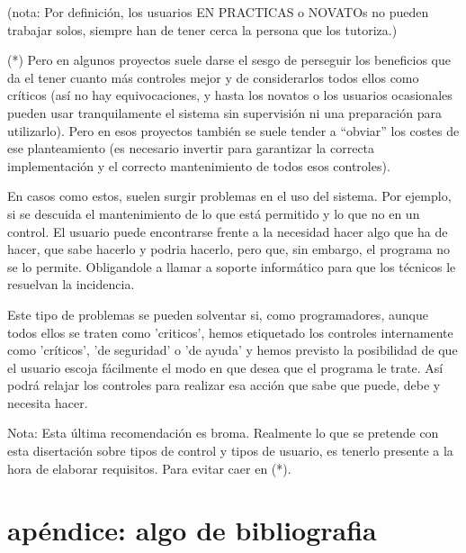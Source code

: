 \documentclass[spanish,12pt,a4paper,final,oneside]{book}
\begin{document}
(nota: Por definición, los usuarios EN PRACTICAS o NOVATOs no pueden trabajar solos, siempre han de tener cerca la persona que los tutoriza.)

(*) Pero en algunos proyectos suele darse el sesgo de perseguir los beneficios que da el tener cuanto más controles mejor y de considerarlos todos ellos como críticos (así no hay equivocaciones, y hasta los novatos o los usuarios ocasionales pueden usar tranquilamente el sistema sin supervisión ni una preparación para utilizarlo). Pero en esos proyectos también se suele tender a ``obviar'' los costes de ese planteamiento (es necesario invertir para garantizar la correcta implementación y el correcto mantenimiento de todos esos controles).

En casos como estos, suelen surgir problemas en el uso del sistema. Por ejemplo, si se descuida el mantenimiento de lo que está permitido y lo que no en un control. El usuario puede encontrarse frente a la necesidad hacer algo que ha de hacer, que sabe hacerlo y podria hacerlo, pero que, sin embargo, el programa no se lo permite. Obligandole a llamar a soporte informático para que los técnicos le resuelvan la incidencia. 

Este tipo de problemas se pueden solventar si, como programadores, aunque todos ellos se traten como 'criticos', hemos etiquetado los controles internamente como 'críticos', 'de seguridad' o 'de ayuda' y hemos previsto la posibilidad de que el usuario escoja fácilmente el modo en que desea que el programa le trate. Así podrá relajar los controles para realizar esa acción que sabe que puede, debe y necesita hacer.

Nota: Esta última recomendación es broma. Realmente lo que se pretende con esta disertación sobre tipos de control y tipos de usuario, es tenerlo presente a la hora de elaborar requisitos. Para evitar caer en (*).

\chapter{apéndice: algo de bibliografia}
\end{document}

